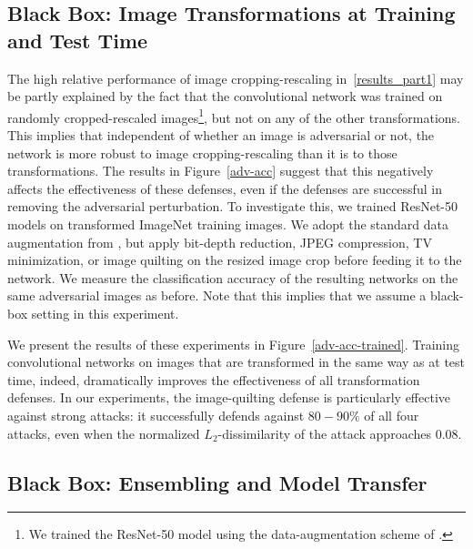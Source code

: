 \subsection{Black Box: Image Transformations at Training and Test Time}
\label{results_part2}

The high relative performance of image cropping-rescaling in~\ref{results_part1} may be partly explained by the fact that the convolutional network was trained on randomly cropped-rescaled images\footnote{We trained the ResNet-50 model using the data-augmentation scheme of \citet{he2016residual}.}, but not on any of the other transformations. This implies that independent of whether an image is adversarial or not, the network is more robust to image cropping-rescaling than it is to those transformations. The results in Figure~\ref{adv-acc} suggest that this negatively affects the effectiveness of these defenses, even if the defenses are successful in removing the adversarial perturbation. To investigate this, we trained ResNet-50 models on transformed ImageNet training images. We adopt the standard data augmentation from \citet{he2016residual}, but apply bit-depth reduction, JPEG compression, TV minimization, or image quilting on the resized image crop before feeding it to the network. We measure the classification accuracy of the resulting networks on the same adversarial images as before. Note that this implies that we assume a black-box setting in this experiment. 

We present the results of these experiments in Figure~\ref{adv-acc-trained}. Training convolutional networks on images that are transformed in the same way as at test time, indeed, dramatically improves the effectiveness of all transformation defenses. In our experiments, the image-quilting defense is particularly effective against strong attacks: it successfully defends against $80 \!-\! 90\%$ of all four attacks, even when the normalized $L_2$-dissimilarity of the attack approaches $0.08$. %

\subsection{Black Box: Ensembling and Model Transfer}
\label{results_part3}

